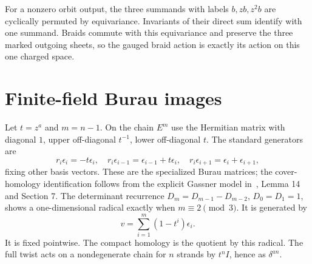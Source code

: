 \documentclass[11pt]{amsart}
\begin{document}
For a nonzero orbit output, the three summands with labels
$b,zb,z^2b$ are cyclically permuted by equivariance. Invariants of
their direct sum identify with one summand. Braids commute with this
equivariance and preserve the three marked outgoing sheets, so the
gauged braid action is exactly its action on this one charged space.

\section{Finite-field Burau images}\label{arith}
Let $t=z^a$ and $m=n-1$. On the chain $E^m$ use the Hermitian matrix
with diagonal $1$, upper off-diagonal $t^{-1}$, lower off-diagonal $t$.
The standard generators are
\begin{equation}\label{braidmatrices}
r_i\epsilon_i=-t\epsilon_i,\quad
r_i\epsilon_{i-1}=\epsilon_{i-1}+t\epsilon_i,\quad
r_i\epsilon_{i+1}=\epsilon_i+\epsilon_{i+1},
\end{equation}
fixing other basis vectors. These are the specialized Burau matrices;
the cover-homology identification follows from the explicit Gassner
model in~\cite{Ven}, Lemma 14 and Section 7. The determinant recurrence
$D_m=D_{m-1}-D_{m-2}$, $D_0=D_1=1$, shows a one-dimensional radical
exactly when $m\equiv2\pmod3$. It is generated by
\[
v=\sum_{i=1}^m(1-t^i)\epsilon_i.
\]
It is fixed pointwise. The compact homology is the quotient by this
radical. The full twist acts on a nondegenerate chain for $n$ strands
by $t^n I$, hence as $\delta^{an}$.
\end{document}
